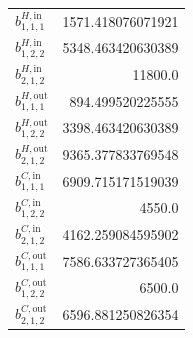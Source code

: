 \documentclass{article}%
\begin{document}
\begin{multicols*}{3}
\begin{supertabular}{lr}
	$b_{1,1,1}^{H,\text{in}}$ & 1571.418076071921 \\%
	$b_{1,2,2}^{H,\text{in}}$ & 5348.463420630389 \\%
	$b_{2,1,2}^{H,\text{in}}$ & 11800.0 \\%
	$b_{1,1,1}^{H,\text{out}}$ & 894.499520225555 \\%
	$b_{1,2,2}^{H,\text{out}}$ & 3398.463420630389 \\%
	$b_{2,1,2}^{H,\text{out}}$ & 9365.377833769548 \\%
	$b_{1,1,1}^{C,\text{in}}$ & 6909.715171519039 \\%
	$b_{1,2,2}^{C,\text{in}}$ & 4550.0 \\%
	$b_{2,1,2}^{C,\text{in}}$ & 4162.259084595902 \\%
	$b_{1,1,1}^{C,\text{out}}$ & 7586.633727365405 \\%
	$b_{1,2,2}^{C,\text{out}}$ & 6500.0 \\%
	$b_{2,1,2}^{C,\text{out}}$ & 6596.881250826354 \\%
\end{supertabular}%
\end{multicols*}%
\clearpage%
\end{document}
